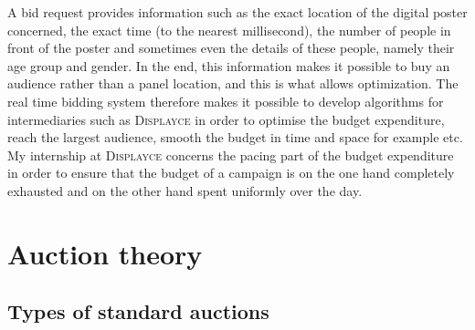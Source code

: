 \documentclass[12pt]{article}
\newcommand{\disp}{\textsc{Displayce}\xspace}
\begin{document}
A bid request provides information such as the exact location of the digital poster concerned, the exact time (to the nearest millisecond), the number of people in front of the poster and sometimes even the details of these people, namely their age group and gender. In the end, this information makes it possible to buy an audience rather than a panel location, and this is what allows optimization. The real time bidding system therefore makes it possible to develop algorithms for intermediaries such as \disp in order to optimise the budget expenditure, reach the largest audience, smooth the budget in time and space for example etc.\\

My internship at \disp concerns the pacing part of the budget expenditure in order to ensure that the budget of a campaign is on the one hand completely exhausted and on the other hand spent uniformly over the day. 

\newpage

\section{Auction theory}
\subsection{Types of standard auctions}
\end{document}

